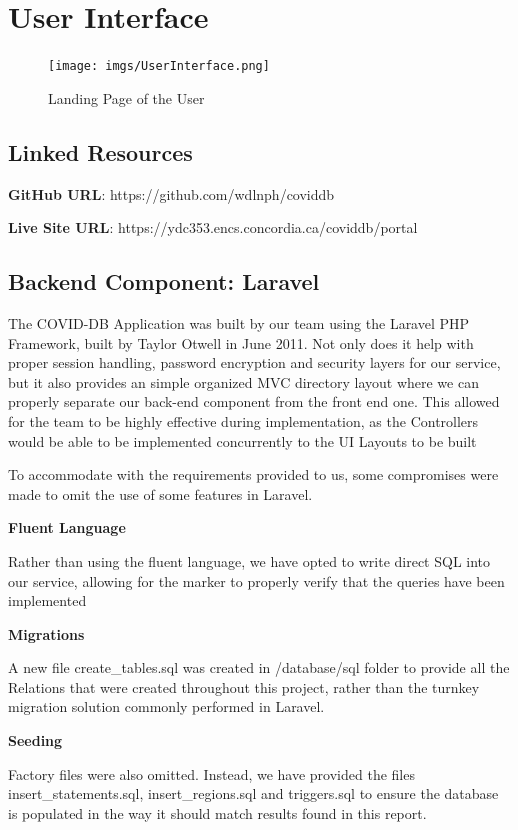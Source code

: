 \section{User Interface}

\begin{figure}[H]
    \centering
    \texttt{[image: imgs/UserInterface.png]}
    \caption{Landing Page of the User}
\end{figure}

\subsection{Linked Resources}

\textbf{GitHub URL}: https://github.com/wdlnph/coviddb

\textbf{Live Site URL}: https://ydc353.encs.concordia.ca/coviddb/portal

\subsection{Backend Component: Laravel}

The COVID-DB Application was built by our team using the Laravel PHP Framework, built by Taylor Otwell in June 2011. Not only does it help with proper session handling, password encryption and security layers for our service, but it also provides an simple organized MVC directory layout where we can properly separate our back-end component from the front end one. This allowed for the team to be highly effective during implementation, as the Controllers would be able to be implemented concurrently to the UI Layouts to be built

To accommodate with the requirements provided to us, some compromises were made to omit the use of some features in Laravel.

\textbf{Fluent Language}

Rather than using the fluent language, we have opted to write direct SQL into our service, allowing for the marker to properly verify that the queries have been implemented

\textbf{Migrations}

A new file create\_tables.sql was created in /database/sql folder to provide all the Relations that were created throughout this project, rather than the turnkey migration solution commonly performed in Laravel.

\textbf{Seeding}

Factory files were also omitted. Instead, we have provided the files insert\_statements.sql, insert\_regions.sql and triggers.sql to ensure the database is populated in the way it should match results found in this report.

